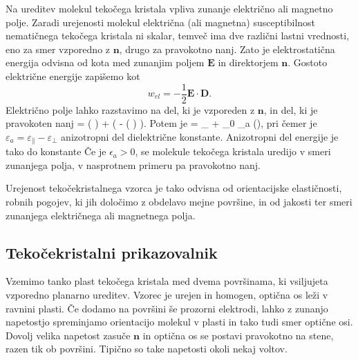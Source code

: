 Na ureditev molekul tekočega kristala vpliva zunanje električno ali magnetno polje.
Zaradi urejenosti molekul električna (ali magnetna) susceptibilnost nematičnega tekočega
kristala ni skalar, temveč ima dve različni lastni vrednosti,
eno za smer vzporedno z $\mathbf{n}$, drugo za pravokotno nanj. Zato je
elektrostatična energija odvisna od kota med zunanjim poljem $\mathbf{E}$
in direktorjem $\mathbf{n}$. Gostoto električne energije 
zapišemo kot 
\begin{equation}
w_{el}=-\frac{1}{2}\mathbf{E}\cdot \mathbf{D}.
\label{lcwe}
\end{equation}
Električno polje lahko razstavimo na del, ki je vzporeden z $\mathbf{n}$, in del, ki je
pravokoten nanj
\beq
{} = ( \cdot {})  + \left(  - 
( \cdot {})  \right).
\eeq
Potem je 
\beq
{} = \varepsilon \varepsilon_\bot {} + \varepsilon_0 \varepsilon_a
(\cdot{}),
\label{7.56a}
\eeq
pri čemer je $\varepsilon_a = \varepsilon_\parallel - \varepsilon_\bot$ anizotropni
del dielektrične konstante. Anizotropni del energije je tako do konstante
Če je $\epsilon_{a}>0$, se molekule tekočega kristala uredijo v smeri 
zunanjega polja, v nasprotnem primeru pa pravokotno nanj.

Urejenost tekočekristalnega vzorca je tako odvisna od orientacijske
elastičnosti, robnih pogojev, ki jih določimo z obdelavo mejne
površine, in od jakosti ter smeri zunanjega električnega ali magnetnega polja.

\subsection*{Tekočekristalni prikazovalnik}
Vzemimo tanko plast tekočega kristala med dvema površinama, ki vsiljujeta
vzporedno planarno ureditev. Vzorec je urejen in homogen, optična os leži v ravnini 
plasti. Če dodamo na površini še prozorni elektrodi, lahko
z zunanjo napetostjo spreminjamo orientacijo molekul v plasti in tako tudi 
smer optične osi. Dovolj velika napetost zasuče $\mathbf{n}$ in optična os
se postavi pravokotno na stene, razen tik ob površini. Tipično so take napetosti okoli 
nekaj voltov.

